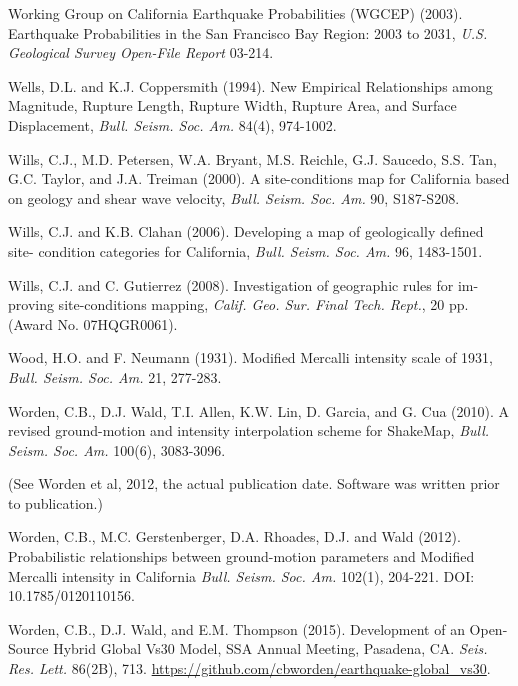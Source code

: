 \documentclass[letterpaper,10pt,english]{sphinxmanual}
\begin{document}
\label{references:wgcep2003}
Working Group on California Earthquake Probabilities (WGCEP) (2003). Earthquake Probabilities
in the San Francisco Bay Region: 2003 to 2031, \emph{U.S. Geological Survey Open-File Report} 03-214.

\label{references:wells1994}
Wells, D.L. and K.J. Coppersmith (1994). New Empirical Relationships among Magnitude,
Rupture Length, Rupture Width, Rupture Area, and Surface Displacement, \emph{Bull. Seism. Soc.
Am.} 84(4), 974-1002.

\label{references:wills2000}
Wills, C.J., M.D. Petersen, W.A. Bryant, M.S. Reichle, G.J. Saucedo, S.S. Tan,
G.C. Taylor, and J.A. Treiman (2000). A site-conditions map for California based on
geology and shear wave velocity, \emph{Bull. Seism. Soc. Am.} 90, S187-S208.

Wills, C.J. and K.B. Clahan (2006). Developing a map of geologically defined site- condition
categories for California, \emph{Bull. Seism. Soc. Am.} 96, 1483-1501.

Wills, C.J. and C. Gutierrez (2008). Investigation of geographic rules for im- proving
site-conditions mapping, \emph{Calif. Geo. Sur. Final Tech. Rept.}, 20 pp. (Award No. 07HQGR0061).

Wood, H.O. and F. Neumann (1931). Modified Mercalli intensity scale of 1931, \emph{Bull. Seism.
Soc. Am.} 21, 277-283.

\label{references:worden2010}
Worden, C.B., D.J. Wald, T.I. Allen, K.W. Lin, D. Garcia, and G. Cua (2010). A revised
ground-motion and intensity interpolation scheme for ShakeMap, \emph{Bull. Seism. Soc. Am.}
100(6), 3083-3096.

\label{references:worden2011}
(See Worden et al, 2012, the actual publication date. Software was
written prior to publication.)

\label{references:worden2012}
Worden, C.B., M.C. Gerstenberger, D.A. Rhoades, D.J. and Wald (2012). Probabilistic
relationships between ground-motion parameters and Modified Mercalli intensity in
California \emph{Bull. Seism. Soc. Am.} 102(1), 204-221. DOI: 10.1785/0120110156.

\label{references:worden2015}
Worden, C.B., D.J. Wald, and E.M. Thompson (2015). Development of an Open-Source Hybrid
Global Vs30 Model, SSA Annual Meeting, Pasadena, CA. \emph{Seis. Res. Lett.} 86(2B), 713. \url{https://github.com/cbworden/earthquake-global\_vs30}.
\end{document}
